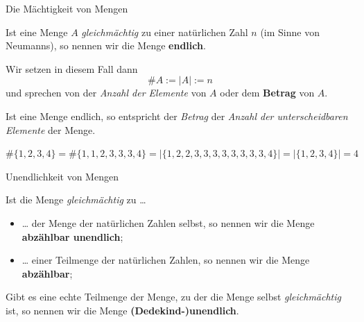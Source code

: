 \documentclass[12pt,ngerman,a4paper,ignorenonframetext,]{beamer}
\providecommand{\tightlist}{%
  \setlength{\itemsep}{0pt}\setlength{\parskip}{0pt}}
\begin{document}
\begin{frame}{Die Mächtigkeit von Mengen}
\protect\hypertarget{die-machtigkeit-von-mengen}{}


\begin{definition}

Ist eine Menge \(A\) \emph{gleichmächtig} zu einer natürlichen Zahl
\(n\) (im Sinne von Neumanns), so nennen wir die Menge \textbf{endlich}.

Wir setzen in diesem Fall dann\\
\[ \#A := |A| := n \] und sprechen von der \emph{Anzahl der Elemente}
von \(A\) oder dem \textbf{Betrag} von \(A\).

\end{definition}


\begin{Fakt}[]

Ist eine Menge endlich, so entspricht der \emph{Betrag} der \emph{Anzahl
der unterscheidbaren Elemente} der Menge.

\end{Fakt}


\begin{Beispiel}[]

\(\#\{1, 2, 3, 4\} = \#\{1, 1, 2, 3, 3, 3, 4\} = |\{1, 2, 2, 3, 3, 3, 3, 3, 3, 3, 3, 4\}| = |\{1, 2, 3, 4\}| = 4\)

\end{Beispiel}

\end{frame}

\begin{frame}{Unendlichkeit von Mengen}
\protect\hypertarget{unendlichkeit-von-mengen}{}


\begin{definition}

Ist die Menge \emph{gleichmächtig} zu \ldots{}

\begin{itemize}
\tightlist
\item
  \ldots{} der Menge der natürlichen Zahlen selbst, so nennen wir die
  Menge \textbf{abzählbar unendlich};
\item
  \ldots{} einer Teilmenge der natürlichen Zahlen, so nennen wir die
  Menge \textbf{abzählbar};
\end{itemize}

Gibt es eine echte Teilmenge der Menge, zu der die Menge selbst
\emph{gleichmächtig} ist, so nennen wir die Menge
\textbf{(Dedekind-)unendlich}.

\end{definition}

\end{frame}
\end{document}
